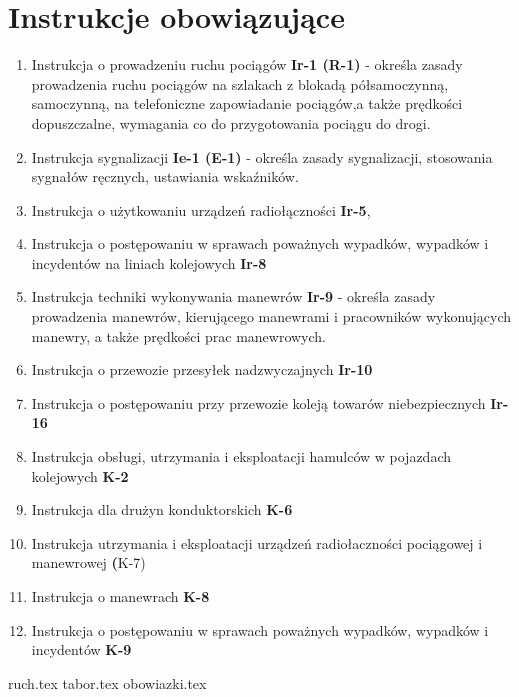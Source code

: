 \documentclass[usenames,dvipsnames,svgnames,table,a4paper,openany,justified]{kaobook}
\begin{document}
\chapter{Instrukcje obowiązujące}
\begin{enumerate}
	\item Instrukcja o prowadzeniu ruchu pociągów \textbf{Ir-1 (R-1)} - określa zasady prowadzenia ruchu pociągów na szlakach z blokadą półsamoczynną, samoczynną, na telefoniczne zapowiadanie pociągów,a także prędkości dopuszczalne, wymagania co do przygotowania pociągu do drogi.
	\item Instrukcja sygnalizacji \textbf{Ie-1 (E-1)} - określa zasady sygnalizacji, stosowania sygnałów ręcznych, ustawiania wskaźników.
	\item Instrukcja o użytkowaniu urządzeń radiołączności \textbf{Ir-5},
	\item Instrukcja o postępowaniu w sprawach poważnych wypadków, wypadków i incydentów na liniach kolejowych \textbf{Ir-8}
	\item Instrukcja techniki wykonywania manewrów \textbf{Ir-9} - określa zasady prowadzenia manewrów, kierującego manewrami i pracowników wykonujących manewry, a także prędkości prac manewrowych.
	\item Instrukcja o przewozie przesyłek nadzwyczajnych \textbf{Ir-10}
	\item Instrukcja o postępowaniu przy przewozie koleją towarów niebezpiecznych \textbf{Ir-16}
	\item Instrukcja obsługi, utrzymania i eksploatacji hamulców w pojazdach kolejowych \textbf{K-2}
	\item Instrukcja dla drużyn konduktorskich \textbf{K-6}
	\item Instrukcja utrzymania i eksploatacji urządzeń radiołaczności pociągowej i manewrowej \textbf(K-7)
	\item Instrukcja o manewrach \textbf{K-8}
	\item Instrukcja o postępowaniu w sprawach poważnych wypadków, wypadków i incydentów \textbf{K-9}
\end{enumerate}
 
	{ruch.tex}
	{tabor.tex}
	{obowiazki.tex}
	\printglossaries
\end{document}
